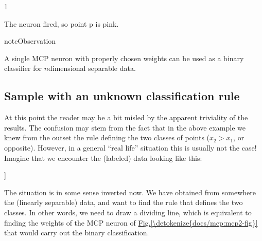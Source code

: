 \documentclass[letterpaper,10pt,english]{jupyterBook}
\begin{document}
\begin{sphinxVerbatim}[commandchars=\\\{\}]
1
\end{sphinxVerbatim}

\sphinxAtStartPar
The neuron fired, so point p is pink.

\begin{sphinxadmonition}{note}{Observation}

\sphinxAtStartPar
A single MCP neuron with properly chosen weights can be used as a binary classifier for \(n\)\sphinxhyphen{}dimensional separable data.
\end{sphinxadmonition}


\subsection{Sample with an unknown classification rule}
\label{\detokenize{docs/perceptron:sample-with-an-unknown-classification-rule}}
\sphinxAtStartPar
At this point the reader may be a bit misled by the apparent triviality of the results. The confusion may stem from the fact that in the above example we knew from the outset the rule defining the two classes of points (\(x_2>x_1\), or opposite). However, in a general “real life” situation this is usually not the case! Imagine that we encounter the (labeled) data  looking like this:

\begin{sphinxVerbatim}[commandchars=\\\{\}]
\PYG{p}{[}\PYG{p}{]}
\end{sphinxVerbatim}

\begin{sphinxVerbatim}[commandchars=\\\{\}]
[[0.34238434 0.06775293 0.        ]
 [0.2771834  0.1100432  0.        ]
 [0.66800363 0.16046044 0.        ]
 [0.1681795  0.41494989 1.        ]
 [0.837124   0.80643535 1.        ]]
\end{sphinxVerbatim}

\noindent{}

\sphinxAtStartPar
The situation is in some sense inverted now. We have obtained from somewhere the (linearly separable) data, and want to find the rule that defines the two classes. In other words, we need to draw a dividing line, which is equivalent to finding the weights of the MCP neuron of \hyperref[\detokenize{docs/mcp:mcp2-fig}]{Fig.\@ \ref{\detokenize{docs/mcp:mcp2-fig}}} that would carry out the binary classification.
\end{document}
